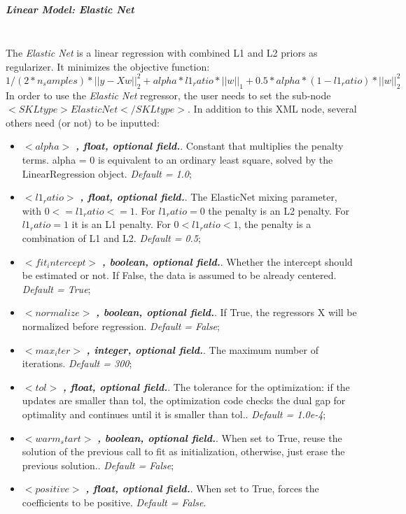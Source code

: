 \subparagraph{Linear Model: Elastic Net}
\mbox{}
\\The \textit{Elastic Net} is a linear regression with combined L1 and L2 priors as regularizer.
It minimizes the objective function:
\begin{equation}
1/(2*n_samples) *||y - Xw||^2_2+alpha*l1_ratio*||w||_1 + 0.5 *alpha*(1 - l1_ratio)*||w||^2_2
\end{equation}
In order to use the  \textit{Elastic Net} regressor, the user needs to set the sub-node $<SKLtype>ElasticNet</SKLtype>$.  In addition to this XML node, several others need (or not) to be inputted:
\begin{itemize}
\item $<alpha>$ \textbf{\textit{, float, optional field.}}.  Constant that multiplies the penalty terms. alpha = 0 is equivalent to an ordinary least square, solved by the LinearRegression object. \textit{Default = 1.0};
\item $<l1_ratio>$ \textbf{\textit{, float, optional field.}}.  The ElasticNet mixing parameter, with $0 <= l1_ratio <= 1$. For $l1_ratio = 0$ the penalty is an L2 penalty. For $l1_ratio = 1$ it is an L1 penalty. For $0 < l1_ratio < 1$, the penalty is a combination of L1 and L2. \textit{Default = 0.5};
\item $<fit_intercept>$ \textbf{\textit{, boolean, optional field.}}.  Whether the intercept should be estimated or not. If False, the data is assumed to be already centered. \textit{Default =  True};
\item $<normalize>$ \textbf{\textit{, boolean, optional field.}}.  If True, the regressors X will be normalized before regression. \textit{Default =  False};
\item $<max_iter>$ \textbf{\textit{, integer, optional field.}}.  The maximum number of iterations. \textit{Default = 300};
\item $<tol>$ \textbf{\textit{, float, optional field.}}.  The tolerance for the optimization: if the updates are smaller than tol, the optimization code checks the dual gap for optimality and continues until it is smaller than tol.. \textit{Default = 1.0e-4};
\item $<warm_start >$ \textbf{\textit{, boolean, optional field.}}.  When set to True, reuse the solution of the previous call to fit as initialization, otherwise, just erase the previous solution.. \textit{Default =  False};
\item $<positive>$ \textbf{\textit{, float, optional field.}}.  When set to True, forces the coefficients to be positive. \textit{Default =  False}.
\end{itemize}

